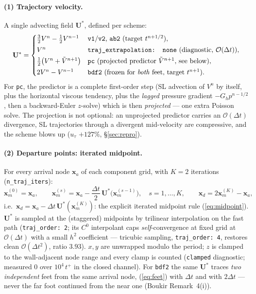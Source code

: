 \documentclass[11pt,a4paper]{article}
\newcommand{\ut}{u_\tau}
\newcommand{\bU}{\mathbf{U}}
\newcommand{\bx}{\mathbf{x}}
\begin{document}
\paragraph{(1) Trajectory velocity.} A single advecting field
$\bU^{*}$, defined per scheme:
\begin{equation}
\bU^{*} =
\begin{cases}
\tfrac32 V^{n}-\tfrac12 V^{n-1} & \text{\texttt{v1}/\texttt{v2}, \texttt{ab2}
(target $t^{n+1/2}$)},\\[2pt]
V^{n} & \text{\texttt{traj\_extrapolation: none} (diagnostic, $\mathcal O(\Delta t)$)},\\[2pt]
\tfrac12\big(V^{n}+\tilde V^{n+1}\big) & \text{\texttt{pc} (projected predictor
$\tilde V^{n+1}$, see below)},\\[2pt]
2V^{n}-V^{n-1} & \text{\texttt{bdf2} (frozen for \emph{both} feet, target $t^{n+1}$)}.
\end{cases}
\label{eq:ustar}
\end{equation}
For \texttt{pc}, the predictor is a complete first-order step (SL advection of
$V^{n}$ by itself, plus the horizontal viscous tendency, plus the
\emph{lagged} pressure gradient $-G_h p^{n-1/2}$, then a backward-Euler
$z$-solve) which is then \emph{projected} --- one extra Poisson solve. The
projection is not optional: an unprojected predictor carries an
$\mathcal O(\Delta t)$ divergence, SL trajectories through a divergent
mid-velocity are compressive, and the scheme blows up
($\ut$ $+127\%$, \S\ref{sec:repro}).

\paragraph{(2) Departure points: iterated midpoint.} For every arrival node
$\bx_a$ of each component grid, with $K=2$ iterations
(\texttt{n\_traj\_iters}):
\begin{equation}
\bx_m^{(0)}=\bx_a,\qquad
\bx_m^{(s)} = \bx_a - \frac{\Delta t}{2}\,\bU^{*}\!\big(\bx_m^{(s-1)}\big),
\quad s=1,\dots,K,\qquad
\bx_d = 2\bx_m^{(K)}-\bx_a,
\label{eq:feet}
\end{equation}
i.e.\ $\bx_d = \bx_a - \Delta t\,\bU^{*}(\bx_m^{(K)})$: the explicit iterated
midpoint rule (\ref{eq:midpoint}). $\bU^{*}$ is sampled at the (staggered)
midpoints by trilinear interpolation on the fast path
(\texttt{traj\_order:~2}; its $C^{0}$ interpolant caps \emph{self}-convergence
at fixed grid at $\mathcal O(\Delta t)$ with a small $h^{2}$ coefficient ---
tricubic sampling, \texttt{traj\_order:~4}, restores clean
$\mathcal O(\Delta t^{2})$, ratio $3.93$). $x,y$ are unwrapped modulo the
period; $z$ is clamped to the wall-adjacent node range and every clamp is
counted (\texttt{clamped} diagnostic; measured $0$ over $10^{4}\,t^{+}$ in
the closed channel). For \texttt{bdf2} the same $\bU^{*}$ traces \emph{two
independent} feet from the same arrival node, (\ref{eq:feet}) with
$\Delta t$ and with $2\Delta t$ --- never the far foot continued from the
near one (Boukir Remark~4(i)).
\end{document}
